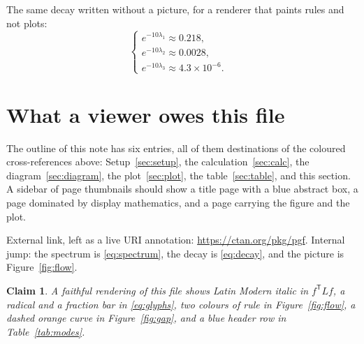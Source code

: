 \documentclass[10pt,twocolumn]{article}
\newtheorem{claim}{Claim}
\theoremstyle{definition}
\begin{document}
The same decay written without a picture, for a renderer that paints rules and not plots:
\begin{equation}
\begin{cases}
e^{-10\lambda_1}\approx 0.218, & \\
e^{-10\lambda_2}\approx 0.0028, & \\
e^{-10\lambda_3}\approx 4.3\times 10^{-6}. &
\end{cases}
\end{equation}

\section{What a viewer owes this file}
\label{sec:viewer}
The outline of this note has six entries, all of them destinations of the coloured cross-references above: Setup~\ref{sec:setup}, the calculation~\ref{sec:calc}, the diagram~\ref{sec:diagram}, the plot~\ref{sec:plot}, the table~\ref{sec:table}, and this section. A sidebar of page thumbnails should show a title page with a blue abstract box, a page dominated by display mathematics, and a page carrying the figure and the plot.

External link, left as a live URI annotation: \url{https://ctan.org/pkg/pgf}.
Internal jump: the spectrum is \eqref{eq:spectrum}, the decay is \eqref{eq:decay}, and the picture is Figure~\ref{fig:flow}.

\begin{claim}
A faithful rendering of this file shows Latin Modern italic in \(f^{\mathsf T}Lf\), a radical and a fraction bar in \eqref{eq:glyphs}, two colours of rule in Figure~\ref{fig:flow}, a dashed orange curve in Figure~\ref{fig:gap}, and a blue header row in Table~\ref{tab:modes}.
\end{claim}
\end{document}
